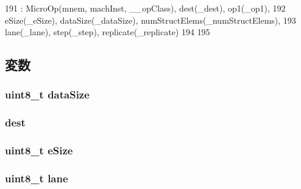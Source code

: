 \begin{DoxyCode}
191         : MicroOp(mnem, machInst, __opClass), dest(_dest), op1(_op1),
192           eSize(_eSize), dataSize(_dataSize), numStructElems(_numStructElems),
193           lane(_lane), step(_step), replicate(_replicate)
194     {
195     }
\end{DoxyCode}


\subsection{変数}
\hypertarget{classArmISA_1_1MicroNeonMixLaneOp64_af13e629a2f79d14821c7b9246ef99e9f}{
\subsubsection[{dataSize}]{\setlength{\rightskip}{0pt plus 5cm}uint8\_\-t {\bf dataSize}}}
\label{classArmISA_1_1MicroNeonMixLaneOp64_af13e629a2f79d14821c7b9246ef99e9f}
\hypertarget{classArmISA_1_1MicroNeonMixLaneOp64_a6563276134c2f303bab0c30e83e02220}{
\subsubsection[{dest}]{ {\bf dest}}}
\label{classArmISA_1_1MicroNeonMixLaneOp64_a6563276134c2f303bab0c30e83e02220}
\hypertarget{classArmISA_1_1MicroNeonMixLaneOp64_aac129ded07ba57383c5e2540f22c94ef}{
\subsubsection[{eSize}]{\setlength{\rightskip}{0pt plus 5cm}uint8\_\-t {\bf eSize}}}
\label{classArmISA_1_1MicroNeonMixLaneOp64_aac129ded07ba57383c5e2540f22c94ef}
\hypertarget{classArmISA_1_1MicroNeonMixLaneOp64_af193aa092c273ecfcd953f986cd68f9d}{
\subsubsection[{lane}]{\setlength{\rightskip}{0pt plus 5cm}uint8\_\-t {\bf lane}}}
